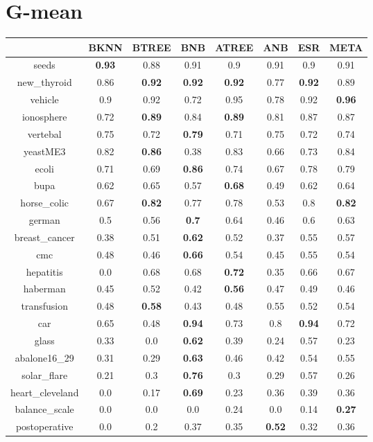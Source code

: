 \documentclass{article}%
\begin{document}
%
\section*{G{-}mean}%
\begin{tabular}{c|ccccccc}%
\hline%
&BKNN&BTREE&BNB&ATREE&ANB&ESR&META\\%
\hline%
seeds&\textbf{0.93}&0.88&0.91&0.9&0.91&0.9&0.91\\%
new\_thyroid&0.86&\textbf{0.92}&\textbf{0.92}&\textbf{0.92}&0.77&\textbf{0.92}&0.89\\%
vehicle&0.9&0.92&0.72&0.95&0.78&0.92&\textbf{0.96}\\%
ionosphere&0.72&\textbf{0.89}&0.84&\textbf{0.89}&0.81&0.87&0.87\\%
vertebal&0.75&0.72&\textbf{0.79}&0.71&0.75&0.72&0.74\\%
yeastME3&0.82&\textbf{0.86}&0.38&0.83&0.66&0.73&0.84\\%
ecoli&0.71&0.69&\textbf{0.86}&0.74&0.67&0.78&0.79\\%
bupa&0.62&0.65&0.57&\textbf{0.68}&0.49&0.62&0.64\\%
horse\_colic&0.67&\textbf{0.82}&0.77&0.78&0.53&0.8&\textbf{0.82}\\%
german&0.5&0.56&\textbf{0.7}&0.64&0.46&0.6&0.63\\%
breast\_cancer&0.38&0.51&\textbf{0.62}&0.52&0.37&0.55&0.57\\%
cmc&0.48&0.46&\textbf{0.66}&0.54&0.45&0.55&0.54\\%
hepatitis&0.0&0.68&0.68&\textbf{0.72}&0.35&0.66&0.67\\%
haberman&0.45&0.52&0.42&\textbf{0.56}&0.47&0.49&0.46\\%
transfusion&0.48&\textbf{0.58}&0.43&0.48&0.55&0.52&0.54\\%
car&0.65&0.48&\textbf{0.94}&0.73&0.8&\textbf{0.94}&0.72\\%
glass&0.33&0.0&\textbf{0.62}&0.39&0.24&0.57&0.23\\%
abalone16\_29&0.31&0.29&\textbf{0.63}&0.46&0.42&0.54&0.55\\%
solar\_flare&0.21&0.3&\textbf{0.76}&0.3&0.29&0.57&0.26\\%
heart\_cleveland&0.0&0.17&\textbf{0.69}&0.23&0.36&0.39&0.36\\%
balance\_scale&0.0&0.0&0.0&0.24&0.0&0.14&\textbf{0.27}\\%
postoperative&0.0&0.2&0.37&0.35&\textbf{0.52}&0.32&0.36\\%
\end{tabular}

%
\end{document}
